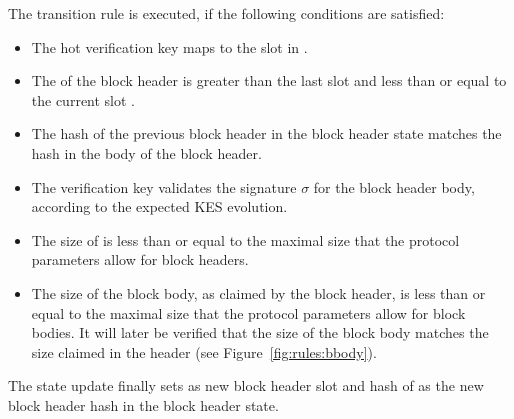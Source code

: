 The transition rule is executed, if the following conditions are satisfied:

\begin{itemize}
\item The hot verification key  maps to the slot  in
  .
\item The  of the block header is greater than the last slot and less
  than or equal to the current slot .
\item The hash  of the previous block header in the block header state
  matches the hash in the body of the block header.
\item The verification key validates the signature $\sigma$ for the block
  header body, according to the expected KES evolution.
\item The size of  is less than or equal to the maximal size that the
  protocol parameters allow for block headers.
\item The size of the block body, as claimed by the block header, is less than or equal to the
  maximal size that the protocol parameters allow for block bodies.
  It will later be verified that the size of the block body matches the size claimed
  in the header (see Figure~\ref{fig:rules:bbody}).
\end{itemize}

The state update finally sets  as new block header slot and hash of
 as the new block header hash in the block header state.

